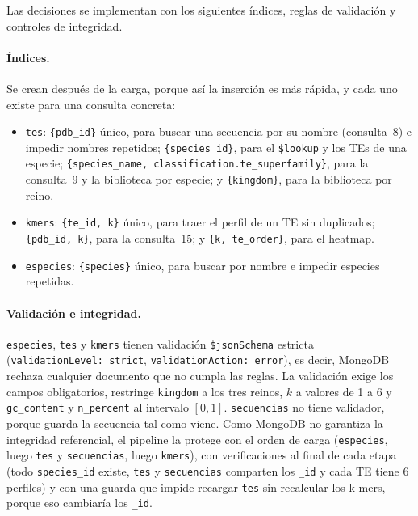 \documentclass[unnumsec,namedate,webpdf,contemporary,large]{oup-authoring-template}
\begin{document}
Las decisiones se implementan con los siguientes \'indices, reglas de validaci\'on y controles de integridad.

\paragraph{\'Indices.} Se crean despu\'es de la carga, porque as\'i la inserci\'on es m\'as r\'apida, y cada uno existe para una consulta concreta:
\begin{itemize}
\item \texttt{tes}: \texttt{\{pdb\_id\}} \'unico, para buscar una secuencia por su nombre (consulta~8) e impedir nombres repetidos; \texttt{\{species\_id\}}, para el \texttt{\$lookup} y los TEs de una especie; \texttt{\{species\_name, classification.te\_superfamily\}}, para la consulta~9 y la biblioteca por especie; y \texttt{\{kingdom\}}, para la biblioteca por reino.
\item \texttt{kmers}: \texttt{\{te\_id, k\}} \'unico, para traer el perfil de un TE sin duplicados; \texttt{\{pdb\_id, k\}}, para la consulta~15; y \texttt{\{k, te\_order\}}, para el heatmap.
\item \texttt{especies}: \texttt{\{species\}} \'unico, para buscar por nombre e impedir especies repetidas.
\end{itemize}

\paragraph{Validaci\'on e integridad.} \texttt{especies}, \texttt{tes} y \texttt{kmers} tienen validaci\'on \texttt{\$jsonSchema} estricta (\texttt{validationLevel: strict}, \texttt{validationAction: error}), es decir, MongoDB rechaza cualquier documento que no cumpla las reglas. La validaci\'on exige los campos obligatorios, restringe \texttt{kingdom} a los tres reinos, $k$ a valores de 1 a 6 y \texttt{gc\_content} y \texttt{n\_percent} al intervalo $[0, 1]$. \texttt{secuencias} no tiene validador, porque guarda la secuencia tal como viene. Como MongoDB no garantiza la integridad referencial, el pipeline la protege con el orden de carga (\texttt{especies}, luego \texttt{tes} y \texttt{secuencias}, luego \texttt{kmers}), con verificaciones al final de cada etapa (todo \texttt{species\_id} existe, \texttt{tes} y \texttt{secuencias} comparten los \texttt{\_id} y cada TE tiene 6 perfiles) y con una guarda que impide recargar \texttt{tes} sin recalcular los k-mers, porque eso cambiar\'ia los \texttt{\_id}.
\end{document}
